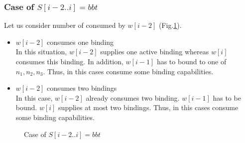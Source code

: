 \documentclass[runningheads]{llncs}
\begin{document}
\subsubsection{Case of $S[i-2..i] = bbt$}
Let us consider number of consumed by $w[i-2]$ (Fig.\ref{TTT_tunnelC_enter_usingBond}).

\begin{itemize}
\item{$w[i-2]$ consumes one binding}\\
  In this situation, $w[i-2]$ supplies one active binding whereas $w[i]$ consumes this binding. In addition, $w[i-1]$ has to bound to one of $n_1, n_2, n_3$.
  Thus, in this cases consume some binding capabilities.

\item{$w[i-2]$ consumes two bindings}\\
  In this case, $w[i-2]$ already consumes two binding. $w[i-1]$ has to be bound. $w[i]$ supplies at most two bindings. Thus, in this cases consume some binding capabilities.
\end{itemize}



\begin{figure}
  \begin{center}
    \caption{Case of $S[i-2..i] = bbt$}
    \label{TTT_tunnelC_enter_usingBond}
  \end{center}
\end{figure}
\end{document}
